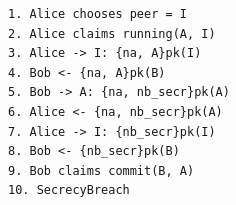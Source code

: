 \begin{lstlisting}[language={}]
1. Alice chooses peer = I
2. Alice claims running(A, I)
3. Alice -> I: {na, A}pk(I)
4. Bob <- {na, A}pk(B)
5. Bob -> A: {na, nb_secr}pk(A)
6. Alice <- {na, nb_secr}pk(A)
7. Alice -> I: {nb_secr}pk(I)
8. Bob <- {nb_secr}pk(B)
9. Bob claims commit(B, A)
10. SecrecyBreach
\end{lstlisting}
